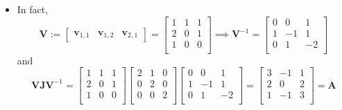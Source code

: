 \documentclass[12pt,a4paper]{article}
\begin{document}
\begin{itemize}
\begin{itemize}
  \item In fact, 
    \begin{equation}\nonumber%
      \bm{V} :=
      \begin{bmatrix}
        \bm{v}_{1,1} & \bm{v}_{1,2} & \bm{v}_{2,1}
      \end{bmatrix}
      = 
      \begin{bmatrix}
        1 & 1 & 1 \\
        2 & 0 & 1 \\
        1 & 0 & 0 \\
      \end{bmatrix}
      \implies
      \bm{V}^{-1}
      = 
      \begin{bmatrix}
        0 & 0 & 1 \\
        1 & -1 & 1 \\
        0 & 1 & -2 \\
      \end{bmatrix}
    \end{equation}
    and
    \begin{equation}\nonumber%
      \bm{V}\bm{J}\bm{V}^{-1}
      = 
      \begin{bmatrix}
        1 & 1 & 1 \\
        2 & 0 & 1 \\
        1 & 0 & 0 \\
      \end{bmatrix}
      \begin{bmatrix}
        2 & 1 & 0 \\
        0 & 2 & 0 \\
        0 & 0 & 2 \\
      \end{bmatrix}
      \begin{bmatrix}
        0 & 0 & 1 \\
        1 & -1 & 1 \\
        0 & 1 & -2 \\
      \end{bmatrix}
      =
      \begin{bmatrix}
        3 & -1 & 1 \\
        2 & 0 & 2 \\
        1 & -1 & 3 \\
      \end{bmatrix}
      = \bm{A}
    \end{equation}

  \end{itemize}

\end{itemize}
\end{document}
